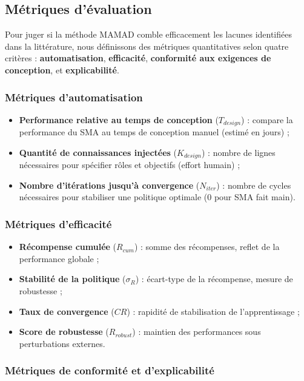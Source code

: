 \subsection{Métriques d'évaluation}

Pour juger si la méthode \ac{MAMAD} comble efficacement les lacunes identifiées dans la littérature, nous définissons des métriques quantitatives selon quatre critères : \textbf{automatisation}, \textbf{efficacité}, \textbf{conformité aux exigences de conception}, et \textbf{explicabilité}.

\subsubsection{Métriques d'automatisation}

\begin{itemize}
    \item \textbf{Performance relative au temps de conception} ($T_{design}$) : compare la performance du \ac{SMA} au temps de conception manuel (estimé en jours) ;
    \item \textbf{Quantité de connaissances injectées} ($K_{design}$) : nombre de lignes nécessaires pour spécifier rôles et objectifs (effort humain) ;
    \item \textbf{Nombre d'itérations jusqu'à convergence} ($N_{iter}$) : nombre de cycles nécessaires pour stabiliser une politique optimale (0 pour \ac{SMA} fait main).
\end{itemize}

\subsubsection{Métriques d'efficacité}

\begin{itemize}
    \item \textbf{Récompense cumulée} ($R_{cum}$) : somme des récompenses, reflet de la performance globale ;
    \item \textbf{Stabilité de la politique} ($\sigma_R$) : écart-type de la récompense, mesure de robustesse ;
    \item \textbf{Taux de convergence} ($CR$) : rapidité de stabilisation de l'apprentissage ;
    \item \textbf{Score de robustesse} ($R_{robust}$) : maintien des performances sous perturbations externes.
\end{itemize}

\subsubsection{Métriques de conformité et d'explicabilité}

